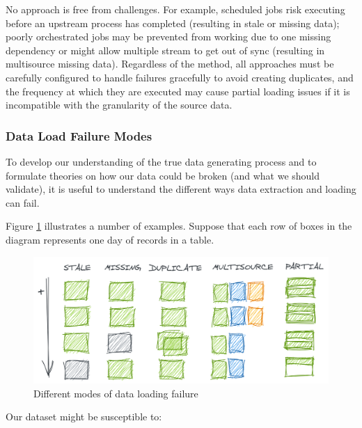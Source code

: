 \documentclass[
]{krantz}
\begin{document}
No approach is free from challenges.
For example, scheduled jobs risk executing before an upstream process has completed (resulting in stale or missing data);
poorly orchestrated jobs may be prevented from working due to one missing dependency or might allow multiple stream to get out of sync (resulting in multisource missing data).
Regardless of the method, all approaches must be carefully configured to handle failures gracefully to avoid creating duplicates, and the frequency at which they are executed may cause partial loading issues if it is incompatible with the granularity of the source data.

\hypertarget{data-load-failure-modes}{%
\subsubsection{Data Load Failure Modes}\label{data-load-failure-modes}}

To develop our understanding of the true data generating process and to formulate theories on how our data could be broken (and what we should validate), it is useful to understand the different ways data extraction and loading can fail.

Figure \ref{fig:data-load} illustrates a number of examples. Suppose that each row of boxes in the diagram represents one day of records in a table.

\begin{figure}

{\centering \includegraphics[width=0.9\linewidth]{figures/data-dall/data-load} 

}

\caption{Different modes of data loading failure}\label{fig:data-load}
\end{figure}

Our dataset might be susceptible to:
\end{document}
